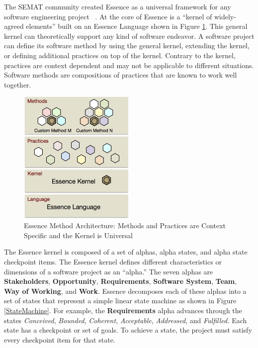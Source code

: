 \documentclass[preprint,12pt,3p]{elsarticle}
\begin{document}
The SEMAT community created Essence as a universal framework for any software engineering project ~\cite{JacobsonQueue}. At the core of Essence is a ``kernel of widely-agreed elements'' built on an Essence Language shown in Figure \ref{EssenceLayers}. This general kernel can theoretically support any kind of software endeavor. A software project can define its software method by using the general kernel, extending the kernel, or defining additional practices on top of the kernel. Contrary to the kernel, practices are context dependent and may not be applicable to different situations. Software methods are compositions of practices that are known to work well together.

\begin{figure}[h]\vspace*{4pt}
\centerline{\includegraphics[width=2.2in]{kernel_images/EssenceLayers}}
\caption{Essence Method Architecture: Methods and Practices are Context Specific and the Kernel is Universal}\vspace*{-6pt}\label{EssenceLayers}
\end{figure}

The Essence kernel is composed of a set of alphas, alpha states, and alpha state checkpoint items. The Essence kernel defines different characteristics or dimensions of a software project as an ``alpha.'' The seven alphas are \textbf{Stakeholders}, \textbf{Opportunity}, \textbf{Requirements}, \textbf{Software System}, \textbf{Team}, \textbf{Way of Working}, and \textbf{Work}. Essence decomposes each of these alphas into a set of states that represent a simple linear state machine as shown in Figure \ref{StateMachine}. For example, the \textbf{Requirements} alpha advances through the states \textit{Conceived}, \textit{Bounded}, \textit{Coherent}, \textit{Acceptable}, \textit{Addressed}, and \textit{Fulfilled.} Each state has a checkpoint or set of goals. To achieve a state, the project must satisfy every checkpoint item for that state. \cite{OMGStandard} 
 
\end{document}
